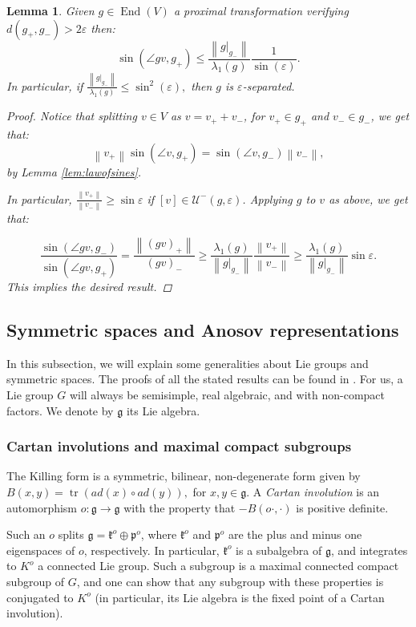 \documentclass{amsart}
\DeclareMathOperator{\End}{End}
\DeclareMathOperator{\trace}{tr}
\newcommand{\norm}[1]{\left\lVert#1\right\rVert}
\newtheorem{lemma}[thm]{Lemma}
\theoremstyle{remark}
\theoremstyle{definition}
\begin{document}
\begin{lemma}
    \label{lem:implicaproximal}
 Given $g \in \End (V)$ a proximal transformation verifying $d(g_+,g_-) > 2\varepsilon$ then:
    $$\sin (\angle gv,g_+) \leq \frac{\norm{g|_{g_-}}}{\lambda_1 (g)} \frac{1}{\sin (\varepsilon)}.$$
 In particular, if $\frac{\norm{g|_{g_-}}}{\lambda_1 (g)} \leq \sin^2 (\varepsilon),$ then $g$ is $\varepsilon$-separated.
    \begin{proof}
 Notice that splitting $v \in V$ as $v = v_+ + v_-$, for $v_+ \in g_+$ and $v_- \in g_-$, we get that: 
        $$\norm{v_+} \sin (\angle v, g_+) = \sin (\angle v,g_-) \norm{v_-},$$
 by Lemma \ref{lem:lawofsines}. 
        
 In particular, $\frac{\norm{v_+}}{\norm{v_-}} \geq \sin \varepsilon$ if $[v] \in \mathcal{U}^- (g,\varepsilon)$.
 Applying $g$ to $v$ as above, we get that:

        $$\frac{\sin (\angle gv,g_-)}{\sin (\angle gv,g_+)} = \frac{\norm{(gv)_+}}{(gv)_-} \geq \frac{\lambda_1 (g)}{\norm{g|_{g_-}}} \frac{\norm{v_+}}{\norm{v_-}} \geq \frac{\lambda_1 (g)}{\norm{g|_{g_-}}} \sin \varepsilon.$$
 This implies the desired result.
    \end{proof}
\end{lemma}

\subsection{Symmetric spaces and Anosov representations}
\label{subsec:symmetric}

In this subsection, we will explain some generalities about Lie groups and symmetric spaces.
The proofs of all the stated results can be found in \cite[Chapter 6]{benoist2016random}.
For us, a Lie group $G$ will always be semisimple, real algebraic, and with non-compact factors. 
We denote by $\mathfrak{g}$ its Lie algebra.

\subsubsection{Cartan involutions and maximal compact subgroups}
The Killing form is a symmetric, bilinear, non-degenerate form given by $B (x,y) = \trace (ad (x) \circ ad (y)),$ for $x,y \in \mathfrak{g}$.
A \emph{Cartan involution} is an automorphism $o: \mathfrak{g} \to \mathfrak{g}$ with the property that $- B (o\cdot,\cdot)$ is positive definite.

Such an $o$ splits $\mathfrak{g} = \mathfrak{k}^o \oplus \mathfrak{p}^o$, where $\mathfrak{k}^o$ and $\mathfrak{p}^o$ are the plus and minus one eigenspaces of $o$, respectively.
In particular, $\mathfrak{k}^o$ is a subalgebra of $\mathfrak{g}$, and integrates to $K^o$ a connected Lie group.
Such a subgroup is a maximal connected compact subgroup of $G$, and one can show that any subgroup with these properties is conjugated to $K^o$ (in particular, its Lie algebra is the fixed point of a Cartan involution).
\end{document}
